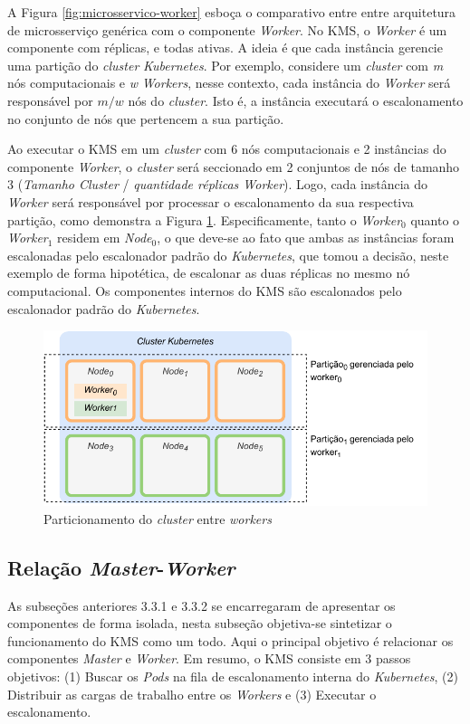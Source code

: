 A Figura \ref{fig:microsservico-worker} esboça o comparativo entre entre arquitetura de microsserviço genérica com o componente \textit{Worker}. No \ac{KMS}, o \textit{Worker} é um componente com réplicas, e todas ativas. A ideia é que cada instância gerencie uma partição do \textit{cluster} \textit{Kubernetes}. Por exemplo, considere um \textit{cluster} com \textit{m} nós computacionais e \textit{w} \textit{Workers}, nesse contexto, cada instância do \textit{Worker} será responsável por $m/w$ nós do \textit{cluster}. Isto é, a instância executará o escalonamento no conjunto de nós que pertencem a sua partição.

Ao executar o \ac{KMS} em um \textit{cluster} com 6 nós computacionais e 2 instâncias do componente \textit{Worker}, o \textit{cluster} será seccionado em 2 conjuntos de nós de tamanho 3 (\textit{Tamanho Cluster} / \textit{quantidade réplicas Worker}). Logo, cada instância do \textit{Worker} será responsável por processar o escalonamento da sua respectiva partição, como demonstra a Figura \ref{fig:particionamento-worker}.
Especificamente, tanto o \textit{Worker$_0$} quanto o \textit{Worker$_1$} residem em \textit{Node$_0$}, o que deve-se ao fato que ambas as instâncias foram escalonadas pelo escalonador padrão do \textit{Kubernetes}, que tomou a decisão, neste exemplo de forma hipotética, de escalonar as duas réplicas no mesmo nó computacional. Os componentes internos do \ac{KMS} são escalonados pelo escalonador padrão do \textit{Kubernetes}.

\begin{figure}[h!]
	\caption{\label{fig:particionamento-worker} Particionamento do \textit{cluster} entre \textit{workers}}
	\centering
	\includegraphics[width=\linewidth]{assets/particionamento-worker.pdf}
\end{figure}

\subsection{Relação \textit{Master}-\textit{Worker}}
As subseções anteriores 3.3.1 e 3.3.2 se encarregaram de apresentar os componentes de forma isolada, nesta subseção objetiva-se sintetizar o funcionamento do \ac{KMS} como um todo. Aqui o principal objetivo é relacionar os componentes \textit{Master} e \textit{Worker}. Em resumo, o \ac{KMS} consiste em 3 passos objetivos: (1) Buscar os \textit{Pods} na fila de escalonamento interna do \textit{Kubernetes}, (2) Distribuir as cargas de trabalho entre os \textit{Workers} e (3) Executar o escalonamento.

